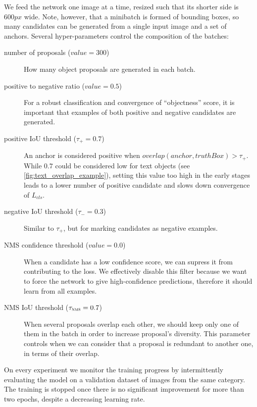		We feed the network one image at a time, resized such that its shorter side is \(600\mathit{px}\) wide. Note, however, that a minibatch is formed of bounding boxes, so many candidates can be generated from a single input image and a set of anchors. Several hyper-parameters control the composition of the batches:
		\begin{description}
			\item[number of proposals (\(\mathit{value} = 300\))] How many object proposals are generated in each batch.

			\item[positive to negative ratio (\(\mathit{value} = 0.5\))] For a robust classification and convergence of ``objectness'' score, it is important that examples of both positive and negative candidates are generated.

			\item[positive IoU threshold (\(\tau_{+} = 0.7\))] An anchor is considered positive when \(\mathit{overlap}(\mathit{anchor}, \mathit{truthBox}) > \tau_+\). While \(0.7\) could be considered low for text objects (see \autoref{fig:text_overlap_example}), setting this value too high in the early stages leads to a lower number of positive candidate and slows down convergence of \(L_{cls}\).

			\item[negative IoU threshold (\(\tau_{-} = 0.3\))] Similar to \(\tau_{+}\), but for marking candidates as negative examples.

			\item[NMS confidence threshold (\(\mathit{value} = 0.0\))] When a candidate has a low confidence score, we can supress it from contributing to the loss. We effectively disable this filter because we want to force the network to give high-confidence predictions, therefore it should learn from all examples.

			\item[NMS IoU threshold (\(\tau_{\textsc{nms}} = 0.7\))] When several proposals overlap each other, we should keep only one of them in the batch in order to increase proposal's diversity. This parameter controls when we can consider that a proposal is redundant to another one, in terms of their overlap.

		\end{description}

		On every experiment we monitor the training progress by intermittently evaluating the model on a validation dataset of images from the same category. The training is stopped once there is no significant improvement for more than two epochs, despite a decreasing learning rate.


